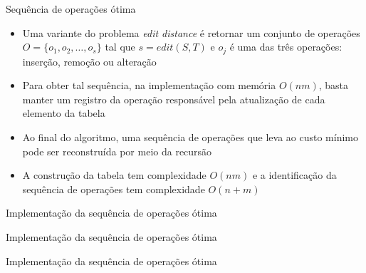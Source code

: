 \begin{frame}[fragile]{Sequência de operações ótima}

    \begin{itemize}
        \item Uma variante do problema {\it edit distance} é retornar um conjunto de operações
            $O = \lbrace o_1, o_2, \ldots, o_s\rbrace$ tal que $s = edit(S, T)$ e $o_j$ é uma
            das três operações: inserção, remoção ou alteração
        \pause

        \item Para obter tal sequência, na implementação com memória $O(nm)$, basta manter um 
            registro da operação responsável pela atualização de cada elemento da tabela
        \pause

        \item Ao final do algoritmo, uma sequência de operações que leva ao custo mínimo pode
            ser reconstruída por meio da recursão
        \pause

        \item A construção da tabela tem complexidade $O(nm)$ e a identificação da sequência
            de operações tem complexidade $O(n + m)$
    \end{itemize}

\end{frame}

\begin{frame}[fragile]{Implementação da sequência de operações ótima}
\end{frame}

\begin{frame}[fragile]{Implementação da sequência de operações ótima}
\end{frame}

\begin{frame}[fragile]{Implementação da sequência de operações ótima}
\end{frame}
